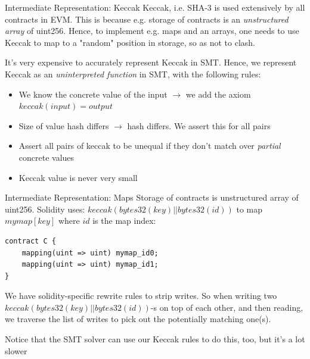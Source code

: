 \documentclass[aspectratio=169]{beamer}
\begin{document}
\begin{frame}[fragile=singleslide]{Intermediate Representation: Keccak}
Keccak, i.e. SHA-3 is used extensively by all contracts in EVM. This is because e.g. storage of contracts is an \emph{unstructured array} of uint256. Hence, to implement e.g. maps and an arrays, one needs to use Keccak to map to a "random" position in storage, so as not to clash.
\bigskip

It's very expensive to accurately represent Keccak in SMT. Hence, we represent Keccak as an \emph{uninterpreted function} in SMT, with the following rules:
\begin{itemize}
\item We know the concrete value of the input $\rightarrow$ we add the axiom $keccak(input)=output$
\item Size of value hash differs $\rightarrow$ hash differs. We assert this for all pairs
\item Assert all pairs of keccak to be unequal if they don't match over \emph{partial} concrete values
\item Keccak value is never very small
\end{itemize}
\end{frame}

\begin{frame}[fragile=singleslide]{Intermediate Representation: Maps}
Storage of contracts is unstructured array of uint256. Solidity uses: $keccak (bytes32(key) || bytes32(id))$ to map $mymap[key]$ where $id$ is the map index:

\begin{Verbatim}[frame=single, framerule=0.2mm, framesep=2mm,fontsize=\small]
contract C {
    mapping(uint => uint) mymap_id0;
    mapping(uint => uint) mymap_id1;
}
\end{Verbatim}
We have solidity-specific rewrite rules to strip writes. So when writing two $keccak (bytes32(key) || bytes32(id))$-s on top of each other, and then reading, we traverse the list of writes to pick out the potentially matching one(s).
\bigskip

Notice that the SMT solver can use our Keccak rules to do this, too, but it's a lot slower
\end{frame}
\end{document}
